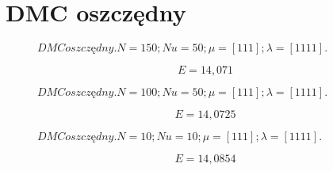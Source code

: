 \section{DMC oszczędny}

\begin{figure}[H]
    \centering
    
    \caption{$DMC oszczędny. N = 150; Nu = 50; \mu = [1 1 1]; \lambda = [1 1 1 1].$}
\end{figure}

\begin{equation}
    E = 14,071
\end{equation}

\begin{figure}[H]
    \centering
    
    \caption{$DMC oszczędny. N = 100; Nu = 50; \mu = [1 1 1]; \lambda = [1 1 1 1].$}
\end{figure}

\begin{equation}
    E = 14,0725
\end{equation}

\begin{figure}[H]
    \centering
    
    \caption{$DMC oszczędny. N = 10; Nu = 10; \mu = [1 1 1]; \lambda = [1 1 1 1].$}
\end{figure}

\begin{equation}
    E = 14,0854
\end{equation}

%     


%     

